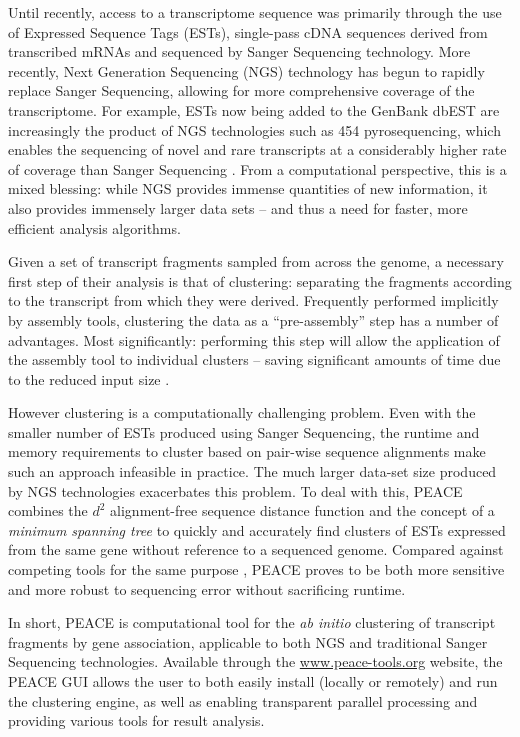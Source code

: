 \documentclass[a4,center,fleqn]{NAR}
\newcommand{\peace} {{\small PEACE}}
\begin{document}
Until recently, access to a transcriptome sequence was primarily
through the use of Expressed Sequence Tags (ESTs), single-pass cDNA
sequences derived from transcribed mRNAs and sequenced by Sanger
Sequencing technology.  More recently, Next Generation Sequencing
(NGS) technology has begun to rapidly replace Sanger Sequencing,
allowing for more comprehensive coverage of the transcriptome.  For
example, ESTs now being added to the GenBank dbEST are increasingly
the product of NGS technologies such as 454 pyrosequencing, which
enables the sequencing of novel and rare transcripts at a considerably
higher rate of coverage than Sanger Sequencing
\cite{Cheung2006,Emrich2007}.  From a computational perspective, this
is a mixed blessing: while NGS provides immense quantities of new
information, it also provides immensely larger data sets -- and thus a
need for faster, more efficient analysis algorithms.

Given a set of transcript fragments sampled from across the genome, a
necessary first step of their analysis is that of clustering: separating
the fragments according to the transcript from which they were
derived.  Frequently performed implicitly by assembly tools,
clustering the data as a ``pre-assembly'' step has a number of
advantages.  Most significantly: performing this step will
allow the application of the assembly tool to individual clusters --
saving significant amounts of time due to the reduced input size
\cite{Hazelhurst08a}.  

However clustering is a computationally challenging problem.  Even
with the smaller number of ESTs produced using Sanger Sequencing, the
runtime and memory requirements to cluster based on pair-wise sequence
alignments make such an approach infeasible in practice.  The much
larger data-set size produced by NGS technologies exacerbates this
problem.  To deal with this, \peace\/ combines the $d^2$
alignment-free sequence distance function \cite{Hide94} and the
concept of a {\it minimum spanning tree} \cite{Prim57} to quickly and
accurately find clusters of ESTs expressed from the same gene without
reference to a sequenced genome.  Compared against competing tools for
the same purpose
\cite{Burke99,Slater00,Huang99,Parkinson02,Kalyanaraman03,Malde03,
  Ptitsyn05,Hazelhurst08a,Picardi09}, \peace\/ proves to be both more
sensitive and more robust to sequencing error without sacrificing
runtime.


In short, \peace\/ is computational tool for the {\it ab initio}
clustering of transcript fragments by gene association, applicable to
both NGS and traditional Sanger Sequencing technologies.  Available
through the \href{http://www.peace-tools.org}{www.peace-tools.org}
website, the \peace\/ GUI allows the user to both easily install
(locally or remotely) and run the clustering engine, as well as
enabling transparent parallel processing and providing various tools
for result analysis.
\end{document}
